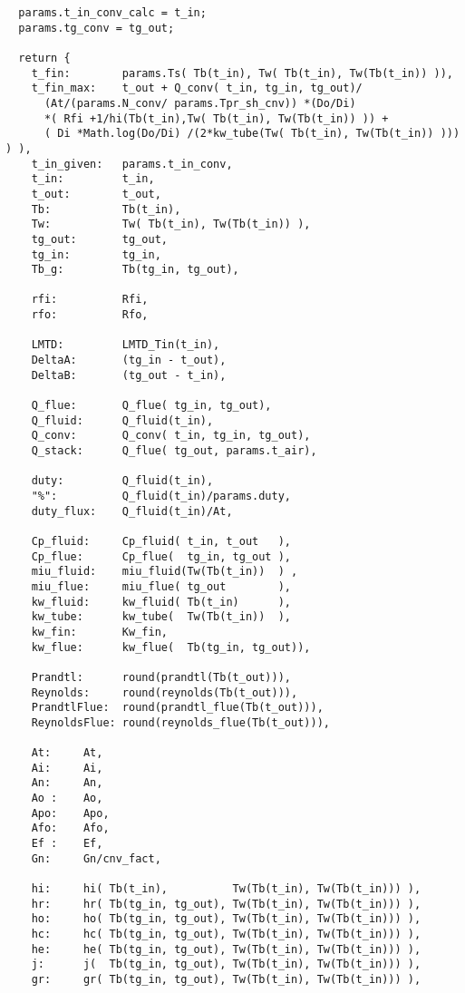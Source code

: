 \begin{verbatim}
  params.t_in_conv_calc = t_in;
  params.tg_conv = tg_out;

  return {
    t_fin:        params.Ts( Tb(t_in), Tw( Tb(t_in), Tw(Tb(t_in)) )),
    t_fin_max:    t_out + Q_conv( t_in, tg_in, tg_out)/
      (At/(params.N_conv/ params.Tpr_sh_cnv)) *(Do/Di) 
      *( Rfi +1/hi(Tb(t_in),Tw( Tb(t_in), Tw(Tb(t_in)) )) +
      ( Di *Math.log(Do/Di) /(2*kw_tube(Tw( Tb(t_in), Tw(Tb(t_in)) ))) ) ),
    t_in_given:   params.t_in_conv,
    t_in:         t_in,
    t_out:        t_out,
    Tb:           Tb(t_in),
    Tw:           Tw( Tb(t_in), Tw(Tb(t_in)) ),
    tg_out:       tg_out,
    tg_in:        tg_in,
    Tb_g:         Tb(tg_in, tg_out),

    rfi:          Rfi,
    rfo:          Rfo,

    LMTD:         LMTD_Tin(t_in),
    DeltaA:       (tg_in - t_out),
    DeltaB:       (tg_out - t_in),

    Q_flue:       Q_flue( tg_in, tg_out),
    Q_fluid:      Q_fluid(t_in),
    Q_conv:       Q_conv( t_in, tg_in, tg_out),
    Q_stack:      Q_flue( tg_out, params.t_air),

    duty:         Q_fluid(t_in),
    "%":          Q_fluid(t_in)/params.duty,
    duty_flux:    Q_fluid(t_in)/At,

    Cp_fluid:     Cp_fluid( t_in, t_out   ),
    Cp_flue:      Cp_flue(  tg_in, tg_out ),
    miu_fluid:    miu_fluid(Tw(Tb(t_in))  ) ,
    miu_flue:     miu_flue( tg_out        ),
    kw_fluid:     kw_fluid( Tb(t_in)      ),
    kw_tube:      kw_tube(  Tw(Tb(t_in))  ),
    kw_fin:       Kw_fin,
    kw_flue:      kw_flue(  Tb(tg_in, tg_out)),

    Prandtl:      round(prandtl(Tb(t_out))),
    Reynolds:     round(reynolds(Tb(t_out))),
    PrandtlFlue:  round(prandtl_flue(Tb(t_out))),
    ReynoldsFlue: round(reynolds_flue(Tb(t_out))),

    At:     At,
    Ai:     Ai,
    An:     An,
    Ao :    Ao,
    Apo:    Apo,
    Afo:    Afo,
    Ef :    Ef,
    Gn:     Gn/cnv_fact,

    hi:     hi( Tb(t_in),          Tw(Tb(t_in), Tw(Tb(t_in))) ),
    hr:     hr( Tb(tg_in, tg_out), Tw(Tb(t_in), Tw(Tb(t_in))) ),
    ho:     ho( Tb(tg_in, tg_out), Tw(Tb(t_in), Tw(Tb(t_in))) ),
    hc:     hc( Tb(tg_in, tg_out), Tw(Tb(t_in), Tw(Tb(t_in))) ),
    he:     he( Tb(tg_in, tg_out), Tw(Tb(t_in), Tw(Tb(t_in))) ),
    j:      j(  Tb(tg_in, tg_out), Tw(Tb(t_in), Tw(Tb(t_in))) ),
    gr:     gr( Tb(tg_in, tg_out), Tw(Tb(t_in), Tw(Tb(t_in))) ),


\end{verbatim}
